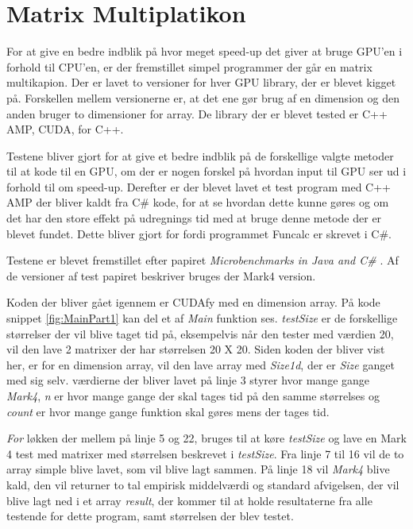 \section{Matrix Multiplatikon}
For at give en bedre indblik på hvor meget speed-up det giver at bruge GPU'en i forhold til CPU'en, er der fremstillet simpel programmer der går en matrix multikapion. Der er lavet to versioner for hver GPU library, der er blevet kigget på. Forskellen mellem versionerne er, at det ene gør brug af en dimension og den anden bruger to dimensioner for array. De library der er blevet tested er C++ AMP, CUDA, for C++.

Testene bliver gjort for at give et bedre indblik på de forskellige valgte metoder til at kode til en GPU, om der er nogen forskel på hvordan input til GPU ser ud i forhold til om speed-up. Derefter er der blevet lavet et test program med C++ AMP der bliver kaldt fra C\# kode, for at se hvordan dette kunne gøres og om det har den store effekt på udregnings tid med at bruge denne metode der er blevet fundet. Dette bliver gjort for fordi programmet Funcalc er skrevet i C\#.

Testene er blevet fremstillet efter papiret \textit{Microbenchmarks in Java and C\#} \cite{Microbenchmarks}. Af de versioner af test papiret beskriver bruges der Mark4 version.

Koden der bliver gået igennem er CUDAfy med en dimension array. På kode snippet \ref{fig:MainPart1} kan del et af \textit{Main} funktion ses. \textit{testSize} er de forskellige størrelser der vil blive taget tid på, eksempelvis når den tester med værdien 20, vil den lave 2 matrixer der har størrelsen 20 X 20. Siden koden der bliver vist her, er for en dimension array, vil den lave array med \textit{Size1d}, der er \textit{Size} ganget med sig selv. værdierne der bliver lavet på linje 3 styrer hvor mange gange \textit{Mark4}, \textit{n} er hvor mange gange der skal tages tid på den samme størrelses og  \textit{count} er hvor mange gange funktion skal gøres mens der tages tid. 

\textit{For} løkken der mellem på linje 5 og 22, bruges til at køre \textit{testSize} og lave en Mark 4 test med matrixer med størrelsen beskrevet i \textit{testSize}. Fra linje 7 til 16 vil de to array simple blive lavet, som vil blive lagt sammen. På linje 18 vil \textit{Mark4} blive kald, den vil returner to tal empirisk middelværdi og standard
afvigelsen, der vil blive lagt ned i et array \textit{result}, der kommer til at holde resultaterne fra alle testende for dette program, samt størrelsen der blev testet.

